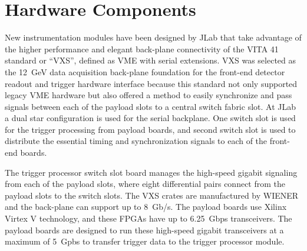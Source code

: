 \section{Hardware Components}

New instrumentation modules have been designed by JLab that take advantage of the higher performance and elegant back-plane connectivity of the VITA 41 standard or ``VXS'', defined as VME with serial extensions. 
VXS was selected as the 12~GeV data acquisition back-plane foundation for the front-end detector readout and trigger hardware interface because this standard not only supported legacy VME hardware but also offered a method to easily synchronize and pass signals between each of the payload slots to a central switch fabric slot. At JLab a dual star configuration is used for the serial backplane. One switch slot is used for the trigger processing from payload boards, and second switch slot is used to distribute the essential timing and synchronization signals to each of the front-end boards.

The trigger processor switch slot board manages the high-speed gigabit signaling from each of the payload slots, where eight differential pairs connect from the payload slots to the switch slots. The VXS crates are manufactured by WIENER and the back-plane can support up to 8~Gb/s. The payload boards use Xilinx Virtex V technology, and these FPGAs have up to 6.25~Gbps transceivers. The payload boards are designed to run these high-speed gigabit transceivers at a maximum of 5~Gpbs to transfer trigger data to the trigger processor module. 

